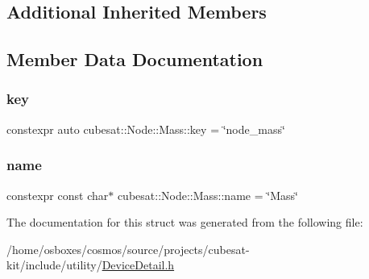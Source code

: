 \subsection*{Additional Inherited Members}


\subsection{Member Data Documentation}
\mbox{\label{structcubesat_1_1Node_1_1Mass_a4d87240a8d3d25bfeb5ec3e04bcdd6c4}} 
\subsubsection{\texorpdfstring{key}{key}}
{\footnotesize\ttfamily constexpr auto cubesat\+::\+Node\+::\+Mass\+::key = \char`\"{}node\+\_\+mass\char`\"{}\hspace{0.3cm}{\ttfamily [static]}}

\mbox{\label{structcubesat_1_1Node_1_1Mass_a032a7d325e46b57cd6ba184e1555d95b}} 
\subsubsection{\texorpdfstring{name}{name}}
{\footnotesize\ttfamily constexpr const char$\ast$ cubesat\+::\+Node\+::\+Mass\+::name = \char`\"{}Mass\char`\"{}\hspace{0.3cm}{\ttfamily [static]}}



The documentation for this struct was generated from the following file\+:\begin{DoxyCompactItemize}
\item 
/home/osboxes/cosmos/source/projects/cubesat-\/kit/include/utility/\hyperlink{DeviceDetail_8h}{Device\+Detail.\+h}\end{DoxyCompactItemize}
